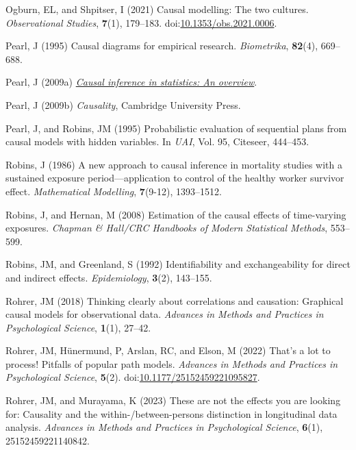 \documentclass[
  singlecolumn]{article}
\newlength{\cslhangindent}
\newenvironment{CSLReferences}[2] %
 {\begin{list}{}{%
  \setlength{\itemindent}{0pt}
  \setlength{\leftmargin}{0pt}
  \setlength{\parsep}{0pt}
  \ifodd #1
   \setlength{\leftmargin}{\cslhangindent}
   \setlength{\itemindent}{-1\cslhangindent}
  \fi
  \setlength{\itemsep}{#2\baselineskip}}}
 {\end{list}}
\begin{document}
\begin{CSLReferences}{1}{0}
Ogburn, EL, and Shpitser, I (2021) Causal modelling: The two cultures.
\emph{Observational Studies}, \textbf{7}(1), 179--183.
doi:\href{https://doi.org/10.1353/obs.2021.0006}{10.1353/obs.2021.0006}.

Pearl, J (1995) Causal diagrams for empirical research.
\emph{Biometrika}, \textbf{82}(4), 669--688.

Pearl, J (2009a) \emph{\href{https://doi.org/10.1214/09-SS057}{Causal
inference in statistics: An overview}}.

Pearl, J (2009b) \emph{Causality}, Cambridge University Press.

Pearl, J, and Robins, JM (1995) Probabilistic evaluation of sequential
plans from causal models with hidden variables. In \emph{UAI}, Vol. 95,
Citeseer, 444--453.

Robins, J (1986) A new approach to causal inference in mortality studies
with a sustained exposure period---application to control of the healthy
worker survivor effect. \emph{Mathematical Modelling}, \textbf{7}(9-12),
1393--1512.

Robins, J, and Hernan, M (2008) Estimation of the causal effects of
time-varying exposures. \emph{Chapman \& Hall/CRC Handbooks of Modern
Statistical Methods}, 553--599.

Robins, JM, and Greenland, S (1992) Identifiability and exchangeability
for direct and indirect effects. \emph{Epidemiology}, \textbf{3}(2),
143--155.

Rohrer, JM (2018) Thinking clearly about correlations and causation:
Graphical causal models for observational data. \emph{Advances in
Methods and Practices in Psychological Science}, \textbf{1}(1), 27--42.

Rohrer, JM, Hünermund, P, Arslan, RC, and Elson, M (2022) That's a lot
to process! Pitfalls of popular path models. \emph{Advances in Methods
and Practices in Psychological Science}, \textbf{5}(2).
doi:\href{https://doi.org/10.1177/25152459221095827}{10.1177/25152459221095827}.

Rohrer, JM, and Murayama, K (2023) These are not the effects you are
looking for: Causality and the within-/between-persons distinction in
longitudinal data analysis. \emph{Advances in Methods and Practices in
Psychological Science}, \textbf{6}(1), 25152459221140842.


\end{CSLReferences}
\end{document}
